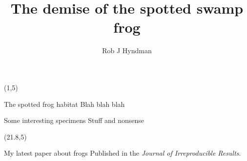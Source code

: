 \documentclass[final]{beamer}
\title{The demise of the spotted swamp frog}
\author{Rob J Hyndman}
\date{}
\begin{document}
\begin{frame}{} 

\begin{textblock}{19.5}(1,5)
\begin{block}{The spotted frog habitat}
Blah blah blah
\end{block}

\begin{block}{Some interesting specimens}
Stuff and nonsense
\end{block}
\end{textblock}

\begin{textblock}{19.3}(21.8,5)
\begin{block}{My latest paper about frogs}
Published in the \emph{Journal of Irreproducible Results}.
\end{block}

\end{textblock}

\end{frame}
\end{document}
